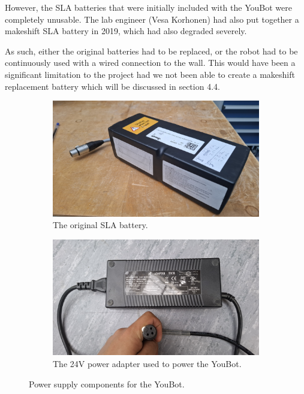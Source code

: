 \documentclass[a4paper, 12pt]{article}
\begin{document}
    However, the SLA batteries that were initially included with the YouBot were completely unusable. The lab engineer (Vesa Korhonen) had also put together a makeshift SLA battery in 2019, which had also degraded severely. 

    As such, either the original batteries had to be replaced, or the robot had to be continuously used with a wired connection to the wall. This would have been a significant limitation to the project had we not been able to create a makeshift replacement battery which will be discussed in section 4.4.
    
    \begin{figure}[ht]
        \centering
        \begin{subfigure}[t]{0.49\linewidth}
            \centering
            \includegraphics[width=\linewidth]{images/sec2/youbot_battery.jpg}
            \caption{The original SLA battery.}
        \end{subfigure}
        \hfill
        \begin{subfigure}[t]{0.49\linewidth}
            \centering
            \includegraphics[width=\linewidth]{images/sec2/power_adapter.jpg}
            \caption{The 24V power adapter used to power the YouBot.}
        \end{subfigure}
        \caption{Power supply components for the YouBot.}
\end{figure}
\end{document}
